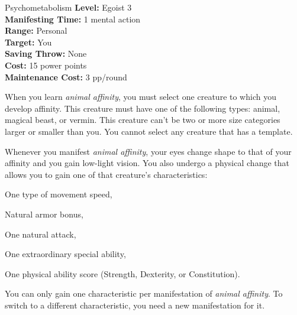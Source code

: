 {Psychometabolism}
{
	\textbf{Level:}
	Egoist 3\\
	\textbf{Manifesting Time:}
	1 mental action\\
	\textbf{Range:}
	Personal\\
	\textbf{Target:}
	You\\
	\textbf{Saving Throw:}
	None\\
	\textbf{Cost:}
	15 power points\\
	\textbf{Maintenance Cost:}
	3 pp/round\\
}
{
	When you learn \emph{animal affinity}, you must select one creature to which you develop affinity. This creature must have one of the following types: animal, magical beast, or vermin. This creature can't be two or more size categories larger or smaller than you. You cannot select any creature that has a template.

	Whenever you manifest \emph{animal affinity}, your eyes change shape to that of your affinity and you gain low-light vision. You also undergo a physical change that allows you to gain one of that creature's characteristics:

	\begin{itemize*}
	\item One type of movement speed,
	\item Natural armor bonus,
	\item One natural attack,
	\item One extraordinary special ability,
	\item One physical ability score (Strength, Dexterity, or Constitution).
	\end{itemize*}

	You can only gain one characteristic per manifestation of \emph{animal affinity}. To switch to a different characteristic, you need a new manifestation for it.
}